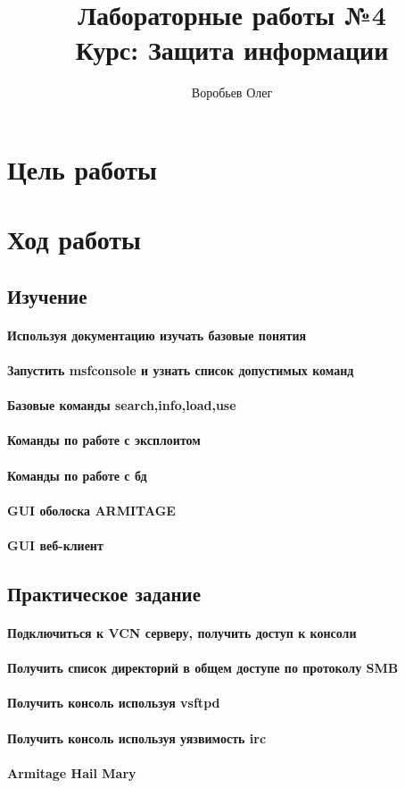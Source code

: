 \documentclass{article}
\title{Лабораторные работы №4 \\ Курс: Защита информации}
\author{Воробьев Олег}
\begin{document}
 	\maketitle
 	\clearpage
 	\tableofcontents
 	\clearpage
 	
 \section{Цель работы}
 \section{Ход работы}
 \subsection{Изучение}
 \paragraph{Используя документацию изучать базовые понятия}
 \paragraph{Запустить msfconsole и узнать список допустимых команд}
 \paragraph{Базовые команды search,info,load,use}
 \paragraph{Команды по работе с эксплоитом}
 \paragraph{Команды по работе с бд}
 \paragraph{GUI оболоска ARMITAGE}
 \paragraph{GUI веб-клиент}
 \subsection{Практическое задание}
 \paragraph{Подключиться к VCN серверу, получить доступ к консоли}
 \paragraph{Получить список директорий в общем доступе по протоколу SMB}
 \paragraph{Получить консоль используя vsftpd}
 \paragraph{Получить консоль используя уязвимость irc}
 \paragraph{Armitage Hail Mary}
 
\end{document}
